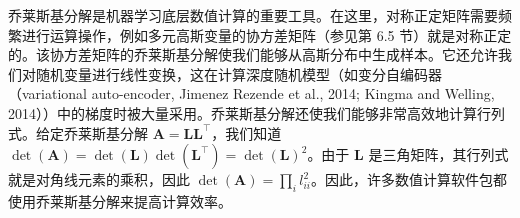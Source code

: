 乔莱斯基分解是机器学习底层数值计算的重要工具。在这里，对称正定矩阵需要频繁进行运算操作，例如多元高斯变量的协方差矩阵（参见第 6.5 节）就是对称正定的。该协方差矩阵的乔莱斯基分解使我们能够从高斯分布中生成样本。它还允许我们对随机变量进行线性变换，这在计算深度随机模型（如变分自编码器（variational auto-encoder, Jimenez Rezende et al., 2014; Kingma and Welling, 2014））中的梯度时被大量采用。乔莱斯基分解还使我们能够非常高效地计算行列式。给定乔莱斯基分解 $ \boldsymbol{A} = \boldsymbol{L} \boldsymbol{L}^\top $，我们知道 $ \det(\boldsymbol{A}) = \det(\boldsymbol{L}) \det(\boldsymbol{L}^\top) = \det(\boldsymbol{L})^2 $。由于 $ \boldsymbol{L} $ 是三角矩阵，其行列式就是对角线元素的乘积，因此 $ \det(\boldsymbol{A}) = \prod_i l_{ii}^2 $。因此，许多数值计算软件包都使用乔莱斯基分解来提高计算效率。
